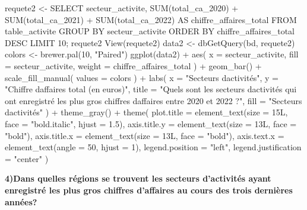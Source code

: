 \documentclass[mstat,12pt]{unswthesis}
\newenvironment{Shaded}{\begin{snugshade}}{\end{snugshade}}
\newcommand{\NormalTok}[1]{#1}
\begin{document}
\begin{Shaded}
\begin{Highlighting}[]
\NormalTok{requete2 \textless{}{-} SELECT secteur\_activite, SUM(total\_ca\_2020) + SUM(total\_ca\_2021) + SUM(total\_ca\_2022) AS chiffre\_affaires\_total}
\NormalTok{FROM table\_activite}
\NormalTok{GROUP BY secteur\_activite}
\NormalTok{ORDER BY chiffre\_affaires\_total DESC}
\NormalTok{LIMIT 10;}
\NormalTok{requete2}
\NormalTok{View(requete2)}
\NormalTok{data2 \textless{}{-} dbGetQuery(bd, requete2)}
\NormalTok{colors \textless{}{-} brewer.pal(10, "Paired")}
\NormalTok{ggplot(data2) +}
\NormalTok{  aes(}
\NormalTok{    x = secteur\_activite,}
\NormalTok{    fill = secteur\_activite,}
\NormalTok{    weight = chiffre\_affaires\_total}
\NormalTok{  ) +}
\NormalTok{  geom\_bar() +}
\NormalTok{  scale\_fill\_manual(}
\NormalTok{    values = colors}
\NormalTok{  ) +}
\NormalTok{  labs(}
\NormalTok{    x = "Secteurs d\textquotesingle{}activités",}
\NormalTok{    y = "Chiffre d\textquotesingle{}affaires total (en euros)",}
\NormalTok{    title = "Quels sont les secteurs d\textquotesingle{}activités qui ont enregistré }
\NormalTok{    les plus gros chiffres d\textquotesingle{}affaires entre 2020 et 2022 ?",}
\NormalTok{    fill = "Secteurs d\textquotesingle{}activités"}
\NormalTok{  ) +}
\NormalTok{  theme\_gray() +}
\NormalTok{  theme(}
\NormalTok{    plot.title = element\_text(size = 15L,}
\NormalTok{                              face = "bold.italic",}
\NormalTok{                              hjust = 1.5),}
\NormalTok{    axis.title.y = element\_text(size = 13L,}
\NormalTok{                                face = "bold"),}
\NormalTok{    axis.title.x = element\_text(size = 13L,}
\NormalTok{                                face = "bold"),}
\NormalTok{    axis.text.x = element\_text(angle = 50, hjust = 1),}
\NormalTok{    legend.position = "left", legend.justification = "center"}
\NormalTok{  )}
\end{Highlighting}
\end{Shaded}

\textbf{4)Dans quelles régions se trouvent les secteurs d'activités
ayant enregistré les plus gros chiffres d'affaires au cours des trois
dernières années? }
\end{document}
